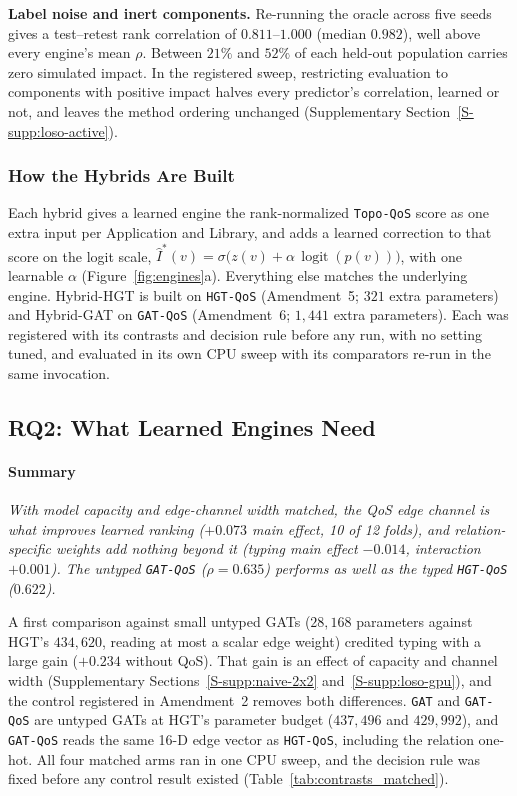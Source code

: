 \documentclass[preprint,3p]{elsarticle}
\begin{document}
\noindent\textbf{Label noise and inert components.} Re-running the oracle across five seeds gives a test--retest rank correlation of $0.811$--$1.000$ (median $0.982$), well above every engine's mean $\rho$. Between $21\%$ and $52\%$ of each held-out population carries zero simulated impact. In the registered sweep, restricting evaluation to components with positive impact halves every predictor's correlation, learned or not, and leaves the method ordering unchanged (Supplementary Section~\ref{S-supp:loso-active}).

\subsubsection{How the Hybrids Are Built}
\label{sec:rq1-hybrid}

Each hybrid gives a learned engine the rank-normalized \texttt{Topo-QoS} score as one extra input per Application and Library, and adds a learned correction to that score on the logit scale, $\hat{I}^*(v) = \sigma\big(z(v) + \alpha\,\operatorname{logit}(p(v))\big)$, with one learnable $\alpha$ (Figure~\ref{fig:engines}a). Everything else matches the underlying engine. Hybrid-HGT is built on \texttt{HGT-QoS} (Amendment~5; $321$ extra parameters) and Hybrid-GAT on \texttt{GAT-QoS} (Amendment~6; $1{,}441$ extra parameters). Each was registered with its contrasts and decision rule before any run, with no setting tuned, and evaluated in its own CPU sweep with its comparators re-run in the same invocation.

\subsection{RQ2: What Learned Engines Need}
\label{sec:rq2}

\paragraph{Summary} \emph{With model capacity and edge-channel width matched, the QoS edge channel is what improves learned ranking ($+0.073$ main effect, 10 of 12 folds), and relation-specific weights add nothing beyond it (typing main effect $-0.014$, interaction $+0.001$). The untyped \texttt{GAT-QoS} ($\rho = 0.635$) performs as well as the typed \texttt{HGT-QoS} ($0.622$).}

A first comparison against small untyped GATs ($28{,}168$ parameters against HGT's $434{,}620$, reading at most a scalar edge weight) credited typing with a large gain ($+0.234$ without QoS). That gain is an effect of capacity and channel width (Supplementary Sections~\ref{S-supp:naive-2x2} and~\ref{S-supp:loso-gpu}), and the control registered in Amendment~2 removes both differences. \texttt{GAT} and \texttt{GAT-QoS} are untyped GATs at HGT's parameter budget ($437{,}496$ and $429{,}992$), and \texttt{GAT-QoS} reads the same 16-D edge vector as \texttt{HGT-QoS}, including the relation one-hot. All four matched arms ran in one CPU sweep, and the decision rule was fixed before any control result existed (Table~\ref{tab:contrasts_matched}).
\end{document}
